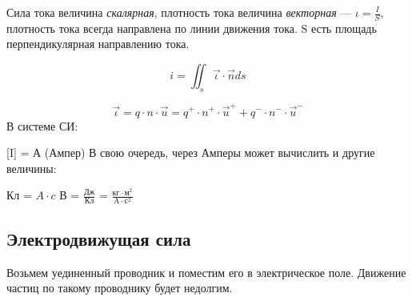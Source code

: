 \documentclass[../main.tex]{subfiles}
\begin{document}
Сила тока величина \textit{скалярная}, плотность тока величина \textit{векторная} --- $\iota = \frac{I}{S}$,
плотность тока всегда направлена по линии движения тока. S есть площадь перпендикулярная направлению тока.

\[i = \iint_{s} \vec \iota \cdot \vec n ds\]

\[\vec \iota = q \cdot n \cdot \vec u = q^{+} \cdot n^{+} \cdot \vec u^{+} + q^{-} \cdot n^{-} \cdot \vec u^{-}\]
В системе СИ:

[I] = А (Ампер)
В свою очередь, через Амперы может вычислить и другие величины:
\begin{center}
    Кл = $A \cdot c$
    В = $\frac{\text{Дж}}{\text{Кл}}$ = $\frac{\text{кг} \cdot \text{м}^2}{\text{A} \cdot \text{с}^2}$
\end{center}

\subsection{Электродвижущая сила}
Возьмем уединенный проводник и поместим его в электрическое поле. Движение частиц по такому проводнику будет недолгим.
\end{document}
